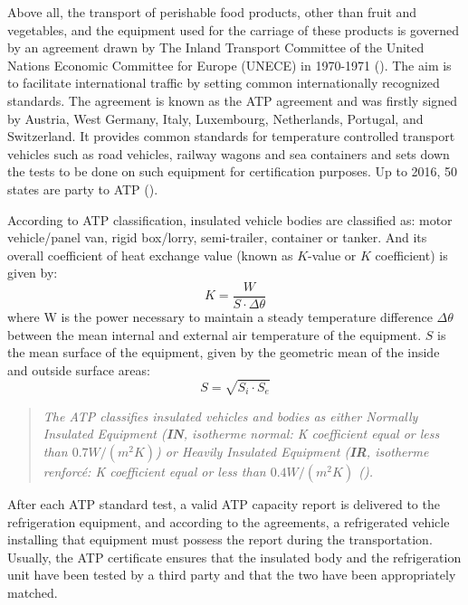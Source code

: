 Above all, the transport of perishable food products, other than fruit and vegetables, and the equipment used for the carriage of these products is governed by an agreement drawn by The Inland Transport Committee of the United Nations Economic Committee for Europe (UNECE) in 1970-1971 (\citet{Geneva1970}). The aim is to facilitate international traffic by setting common internationally recognized standards. The agreement is known as the ATP agreement and was firstly signed by Austria, West Germany, Italy, Luxembourg, Netherlands, Portugal, and Switzerland.  It provides common standards for temperature controlled transport vehicles such as road vehicles, railway wagons and sea containers and sets down the tests to be done on such equipment for certification purposes. Up to 2016, 50 states are party to ATP (\citet{ATP_wiki}).


According to ATP classification, insulated vehicle bodies are classified as: motor vehicle/panel van, rigid box/lorry, semi-trailer, container or tanker. And its overall coefficient of heat exchange value (known as $K$-value or $K$ coefficient) is given by:
\begin{equation}
K = \frac{W}{S\cdot \Delta \theta}
\end{equation}
where W is  the  power  necessary  to  maintain  a  steady  temperature  difference $\Delta \theta$ between  the  mean internal and external air temperature of the equipment. $S$ is the mean surface of the equipment, given by the geometric mean of the inside and outside surface areas:
\begin{equation}
S = \sqrt{S_i \cdot S_e}
\end{equation}

\begin{quote}
	\textit{The ATP classifies insulated vehicles and bodies as either Normally Insulated Equipment (\textbf{IN}, isotherme normal: K coefficient equal or less than $ 0.7 W/(m^2 K) $) or Heavily Insulated Equipment (\textbf{IR}, isotherme renforcé: K coefficient equal or less than $ 0.4 W/(m^2 K )$ (\citet{Tassou2009}).}
\end{quote}

After each ATP standard test, a valid ATP capacity report is delivered to the refrigeration equipment, and according to the agreements, a refrigerated vehicle installing that equipment must possess the report during the transportation. Usually, the ATP certificate ensures that the insulated body and the refrigeration unit have been tested by a third party and that the two have been appropriately matched.

